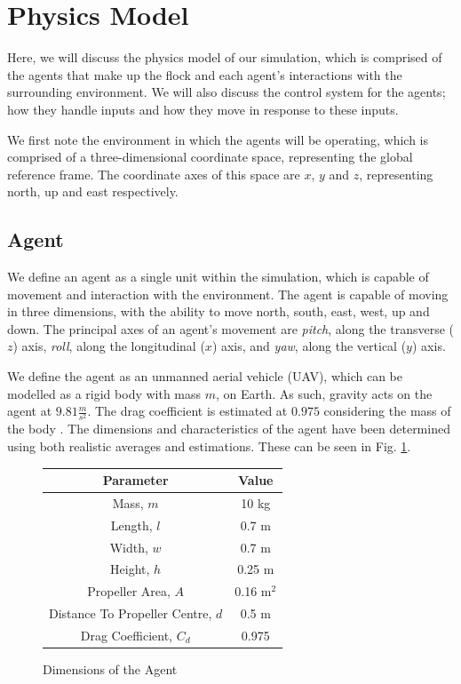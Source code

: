 \documentclass[12pt]{article}
\begin{document}
\newpage
\section{Physics Model}
Here, we will discuss the physics model of our simulation, which is comprised of the agents that make up the flock and each agent's interactions with the surrounding environment. We will also discuss the control system for the agents; how they handle inputs and how they move in response to these inputs.

We first note the environment in which the agents will be operating, which is comprised of a three-dimensional coordinate space, representing the global reference frame. The coordinate axes of this space are $x$, $y$ and $z$, representing north, up and east respectively.

\subsection{Agent}
We define an agent as a single unit within the simulation, which is capable of movement and interaction with the environment. The agent is capable of moving in three dimensions, with the ability to move north, south, east, west, up and down. The principal axes of an agent's movement are \emph{pitch}, along the transverse ($z$) axis, \emph{roll}, along the longitudinal ($x$) axis, and \emph{yaw}, along the vertical ($y$) axis.

We define the agent as an unmanned aerial vehicle (UAV), which can be modelled as a rigid body with mass $m$, on Earth. As such, gravity acts on the agent at $9.81\frac{m}{s^2}$. The drag coefficient is estimated at $0.975$ considering the mass of the body \cite{Hattenberger}. The dimensions and characteristics of the agent have been determined using both realistic averages \cite{Figliozzi} and estimations. These can be seen in Fig. \ref{fig:dimensions}.

\begin{figure}[ht]
    \centering
    \begin{tabular}{| c | c |} 
    \hline
    Parameter & Value \\ 
    \hline
    Mass, $m$ & 10 kg \\
    \hline
    Length, $l$ & 0.7 m \\
    \hline
    Width, $w$ & 0.7 m \\
    \hline
    Height, $h$ & 0.25 m \\
    \hline
    Propeller Area, $A$ & 0.16 m$^2$ \\
    \hline
    Distance To Propeller Centre, $d$ & 0.5 m \\
    \hline
    Drag Coefficient, $C_d$ & 0.975 \\
    \hline
    \end{tabular}
    \caption{Dimensions of the Agent}
    \label{fig:dimensions}
\end{figure}
\end{document}
